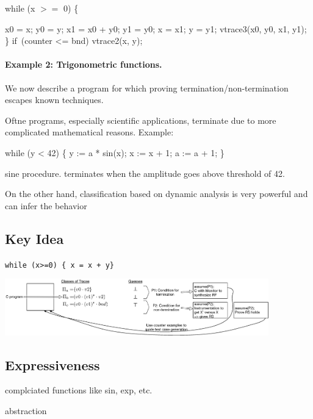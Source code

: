 \begin{center}
  \begin{program}[style=tt]
wh\tab ile (x $>=$ 0) \{

  x0 = x;
  y0 = y;
  x1 = x0 + y0;
  y1 = y0;
  x = x1;
  y = y1;
  vtrace3(x0, y0, x1, y1);
\}
if\tab\ (counter <= bnd) 
  vtrace2(x, y);
  \end{program}
\end{center}



\paragraph{Example 2: Trigonometric functions.}
We now describe a program for which proving termination/non-termination 
escapes known techniques.

Oftne programs, especially scientific applications, terminate due to more complicated mathematical reasons. Example:
\begin{center}
  \begin{program}[style=tt]
    wh\tab ile (y < 42) \{
      y := a * sin(x);
      x := x + 1;
      a := a + 1; \untab
    \}
  \end{program}
\end{center}
sine procedure. terminates when the amplitude goes above threshold of 42.

On the other hand, classification based on dynamic analysis is very powerful and can infer the behavior




\subsection{Key Idea}

\begin{center}
\texttt{while (x>=0) \{ x = x + y\}}

\bigskip
\includegraphics[width=4.5in]{boxes.eps}

\end{center}

\subsection{Expressiveness}

complciated functions like sin, exp, etc.

abstraction
